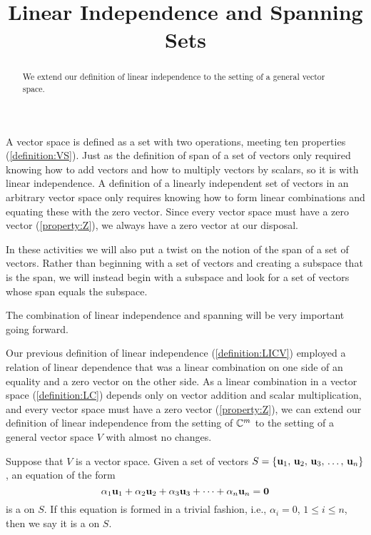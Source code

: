 \documentclass{ximera}
\title{Linear Independence and Spanning Sets}
\begin{document}
\begin{abstract}
  We extend our definition of linear independence to the setting of a general vector space.
\end{abstract}
\maketitle

A vector space is defined as a set with two operations, meeting ten
properties (\ref{definition:VS}).  Just as the definition of span of a
set of vectors only required knowing how to add vectors and how to
multiply vectors by scalars, so it is with linear independence.  A
definition of a linearly independent set of vectors in an arbitrary
vector space only requires knowing how to form linear combinations and
equating these with the zero vector.  Since every vector space must
have a zero vector (\ref{property:Z}), we always have a zero vector at
our disposal.

In these activities we will also put a twist on the notion of the span
of a set of vectors.  Rather than beginning with a set of vectors and
creating a subspace that is the span, we will instead begin with a
subspace and look for a set of vectors whose span equals the subspace.

The combination of linear independence and spanning will be very
important going forward.

Our previous definition of linear independence (\ref{definition:LICV})
employed a relation of linear dependence that was a linear combination
on one side of an equality and a zero vector on the other side.  As a
linear combination in a vector space (\ref{definition:LC}) depends
only on vector addition and scalar multiplication, and every vector
space must have a zero vector (\ref{property:Z}), we can extend our
definition of linear independence from the setting of $\mathbb{C}^{m}$ to
the setting of a general vector space $V$ with almost no changes.

\begin{definition}
  Suppose that $V$ is a vector space.  Given a set of vectors
  $S=\left\{\mathbf{u}_{1},\,\mathbf{u}_{2},\,\mathbf{u}_{3},\,\ldots,\,\mathbf{u}_{n}\right\}$, an equation of the form
  \[
    \alpha_{1}\mathbf{u}_{1}+\alpha_{2}\mathbf{u}_{2}+\alpha_{3}\mathbf{u}_{3}+\cdots +\alpha_{n}\mathbf{u}_{n}=\mathbf{0}
  \]
  is a  on $S$.  If this equation
  is formed in a trivial fashion, i.e., $\alpha_i=0$, $1\leq i\leq n$,
  then we say it is a  on
  $S$.
\end{definition}
\end{document}
